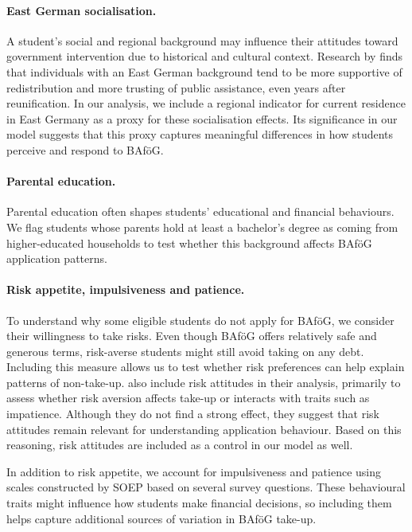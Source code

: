 \paragraph{East German socialisation.}  
A student’s social and regional background may influence their attitudes toward government intervention due to historical and cultural context. Research by \cite{alesina_good-bye_2007} finds that individuals with an East German background tend to be more supportive of redistribution and more trusting of public assistance, even years after reunification. In our analysis, we include a regional indicator for current residence in East Germany as a proxy for these socialisation effects. Its significance in our model suggests that this proxy captures meaningful differences in how students perceive and respond to BAföG.

\paragraph{Parental education.}  
Parental education often shapes students’ educational and financial behaviours. We flag students whose parents hold at least a bachelor’s degree as coming from higher-educated households to test whether this background affects BAföG application patterns.

\paragraph{Risk appetite, impulsiveness and patience.}  

To understand why some eligible students do not apply for BAföG, we consider their willingness to take risks. 
Even though BAföG offers relatively safe and generous terms, risk-averse students might still avoid taking on any debt. 
Including this measure allows us to test whether risk preferences can help explain patterns of non-take-up. 
\cite{herber_non-take-up_2019} also include risk attitudes in their analysis, primarily to assess whether risk aversion affects take-up or interacts with traits such as impatience. Although they do not find a strong effect, they suggest that risk attitudes remain relevant for understanding application behaviour. 
Based on this reasoning, risk attitudes are included as a control in our model as well.

In addition to risk appetite, we account for impulsiveness and patience using scales constructed by SOEP based on several survey questions. These behavioural traits might influence how students make financial decisions, so including them helps capture additional sources of variation in BAföG take-up.




